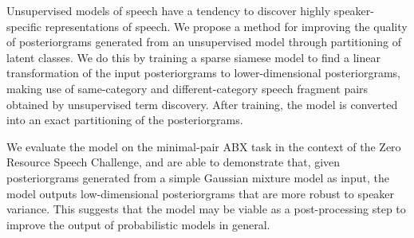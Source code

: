Unsupervised models of speech have a tendency to discover highly speaker-specific representations of speech.
We propose a method for improving the quality of posteriorgrams generated from an unsupervised model through partitioning of latent classes.
We do this by training a sparse siamese model to find a linear transformation of the input posteriorgrams to lower-dimensional posteriorgrams, making use of same-category and different-category speech fragment pairs obtained by unsupervised term discovery.
After training, the model is converted into an exact partitioning of the posteriorgrams.

We evaluate the model on the minimal-pair ABX task in the context of the Zero Resource Speech Challenge, and are able to demonstrate that, given posteriorgrams generated from a simple Gaussian mixture model as input, the model outputs low-dimensional posteriorgrams that are more robust to speaker variance.
This suggests that the model may be viable as a post-processing step to improve the output of probabilistic models in general.

